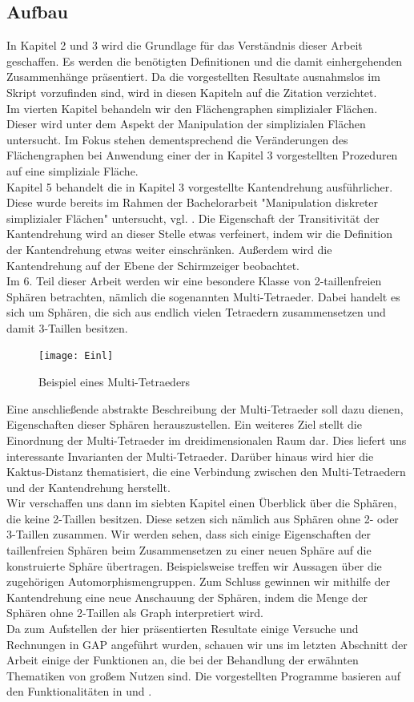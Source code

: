 \documentclass[12pt,titlepage,twoside,cleardoublepage]{article}
\theoremstyle{nummermitklammern}
\numberwithin{equation}{section}
\begin{document}
\subsection{Aufbau}
In Kapitel 2 und 3 wird die Grundlage für das Verständnis dieser Arbeit geschaffen. Es werden die benötigten Definitionen und die damit einhergehenden Zusammenhänge präsentiert. Da die vorgestellten Resultate ausnahmslos im Skript \cite{simp} vorzufinden sind, wird in diesen Kapiteln auf die Zitation verzichtet.\\
Im vierten Kapitel behandeln wir den Flächengraphen simplizialer Flächen. Dieser wird unter dem Aspekt der Manipulation der simplizialen Flächen untersucht. Im Fokus stehen dementsprechend die Veränderungen des Flächengraphen bei Anwendung einer der in Kapitel 3 vorgestellten Prozeduren auf eine simpliziale Fläche.\\
Kapitel 5 behandelt die in Kapitel 3 vorgestellte  Kantendrehung ausführlicher. Diese wurde bereits im Rahmen der Bachelorarbeit "Manipulation diskreter simplizialer Flächen"$ $
untersucht, vgl. \cite{Rey}. Die Eigenschaft der Transitivität der Kantendrehung wird an dieser Stelle etwas verfeinert, indem wir die Definition der Kantendrehung etwas weiter einschränken. Außerdem wird die Kantendrehung auf der Ebene der Schirmzeiger beobachtet.\\
Im 6. Teil dieser Arbeit werden wir eine besondere Klasse von 2-taillenfreien Sphären betrachten, nämlich die sogenannten Multi-Tetraeder. Dabei handelt es sich um Sphären, die sich aus endlich vielen Tetraedern zusammensetzen und damit 3-Taillen besitzen.
\begin{figure}[H]
\begin{center}
\texttt{[image: Einl]}
\end{center}
\caption{Beispiel eines Multi-Tetraeders}
\end{figure}
Eine anschließende abstrakte Beschreibung der Multi-Tetraeder soll dazu dienen, Eigenschaften dieser Sphären herauszustellen. Ein weiteres Ziel stellt die Einordnung der Multi-Tetraeder im dreidimensionalen Raum dar. Dies liefert uns interessante Invarianten der Multi-Tetraeder. Darüber hinaus wird hier die Kaktus-Distanz thematisiert, die eine Verbindung zwischen den Multi-Tetraedern und der Kantendrehung herstellt.\\
Wir verschaffen uns dann im siebten Kapitel einen Überblick über die Sphären, die keine 2-Taillen besitzen. Diese setzen sich nämlich aus Sphären ohne 2- oder 3-Taillen zusammen. Wir werden sehen, dass sich einige Eigenschaften der taillenfreien Sphären beim Zusammensetzen zu einer neuen Sphäre auf die konstruierte Sphäre übertragen. Beispielsweise treffen wir Aussagen über die zugehörigen Automorphismengruppen. Zum Schluss gewinnen wir mithilfe der Kantendrehung eine neue Anschauung der Sphären, indem die Menge der Sphären ohne 2-Taillen als Graph interpretiert wird.\\
Da zum Aufstellen der hier präsentierten Resultate einige Versuche und Rechnungen in GAP angeführt wurden, schauen wir uns im letzten Abschnitt der Arbeit einige der Funktionen an, die bei der Behandlung der erwähnten Thematiken von großem Nutzen sind. Die vorgestellten Programme basieren auf den Funktionalitäten in \cite{gapsimp} und \cite{gap}. 
\end{document}
